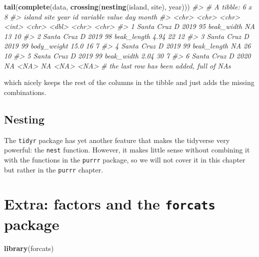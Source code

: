 \documentclass[]{book}
\newenvironment{Shaded}{}{}
\newcommand{\CommentTok}[1]{\textcolor[rgb]{0.38,0.63,0.69}{\textit{#1}}}
\newcommand{\KeywordTok}[1]{\textcolor[rgb]{0.00,0.44,0.13}{\textbf{#1}}}
\newcommand{\NormalTok}[1]{#1}
\begin{document}
\begin{Shaded}
\begin{Highlighting}[]
\KeywordTok{tail}\NormalTok{(}\KeywordTok{complete}\NormalTok{(data, }\KeywordTok{crossing}\NormalTok{(}\KeywordTok{nesting}\NormalTok{(island, site), year))) }
\CommentTok{#> # A tibble: 6 x 8}
\CommentTok{#>   island     site  year     id variable    value day   month}
\CommentTok{#>   <chr>      <chr> <chr> <int> <chr>       <dbl> <chr> <chr>}
\CommentTok{#> 1 Santa Cruz D     2019     95 beak_width  NA    13    10   }
\CommentTok{#> 2 Santa Cruz D     2019     98 beak_length  4.94 22    12   }
\CommentTok{#> 3 Santa Cruz D     2019     99 body_weight 15.0  16    7    }
\CommentTok{#> 4 Santa Cruz D     2019     99 beak_length NA    26    10   }
\CommentTok{#> 5 Santa Cruz D     2019     99 beak_width   2.04 30    7    }
\CommentTok{#> 6 Santa Cruz D     2020     NA <NA>        NA    <NA>  <NA>}
\CommentTok{# the last row has been added, full of NAs}
\end{Highlighting}
\end{Shaded}

which nicely keeps the rest of the columns in the tibble and just adds the missing combinations.

\hypertarget{nesting}{%
\subsection{Nesting}\label{nesting}}

The \texttt{tidyr} package has yet another feature that makes the tidyverse very powerful: the \texttt{nest} function. However, it makes little sense without combining it with the functions in the \texttt{purrr} package, so we will not cover it in this chapter but rather in the \texttt{purrr} chapter.

\hypertarget{extra-factors-and-the-forcats-package}{%
\section{\texorpdfstring{Extra: factors and the \texttt{forcats} package}{Extra: factors and the forcats package}}\label{extra-factors-and-the-forcats-package}}

\begin{Shaded}
\begin{Highlighting}[]
\KeywordTok{library}\NormalTok{(forcats)}
\end{Highlighting}
\end{Shaded}
\end{document}
